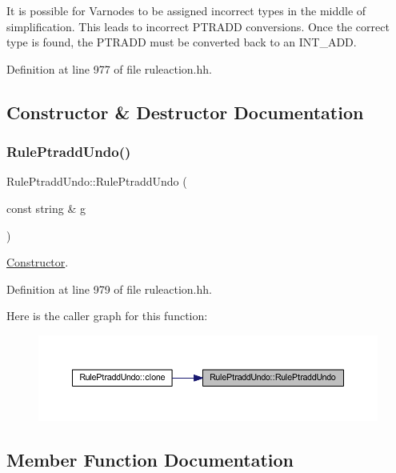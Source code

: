 It is possible for Varnodes to be assigned incorrect types in the middle of simplification. This leads to incorrect P\+T\+R\+A\+DD conversions. Once the correct type is found, the P\+T\+R\+A\+DD must be converted back to an I\+N\+T\+\_\+\+A\+DD. 

Definition at line 977 of file ruleaction.\+hh.



\subsection{Constructor \& Destructor Documentation}
\mbox{\label{class_rule_ptradd_undo_a14cf0cd1747af7cef5ab4bf62b1c75c8}} 
\subsubsection{\texorpdfstring{RulePtraddUndo()}{RulePtraddUndo()}}
{\footnotesize\ttfamily Rule\+Ptradd\+Undo\+::\+Rule\+Ptradd\+Undo (\begin{DoxyParamCaption}\item[{const string \&}]{g }\end{DoxyParamCaption})\hspace{0.3cm}{\ttfamily [inline]}}



\mbox{\hyperlink{class_constructor}{Constructor}}. 



Definition at line 979 of file ruleaction.\+hh.

Here is the caller graph for this function\+:
\nopagebreak
\begin{figure}[H]
\begin{center}
\leavevmode
\includegraphics[width=350pt]{class_rule_ptradd_undo_a14cf0cd1747af7cef5ab4bf62b1c75c8_icgraph}
\end{center}
\end{figure}


\subsection{Member Function Documentation}
\mbox{\label{class_rule_ptradd_undo_afc408fd7b407b90b30b2d039e6a1ed14}} 
